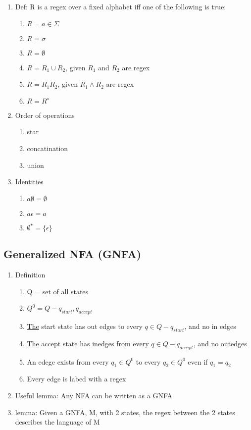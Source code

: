 \documentclass[11pt]{article}
\begin{document}
\begin{enumerate}
\item Def: R is a regex over a fixed alphabet iff one of the
      following is true:

\begin{enumerate}
\item $R=a\in\Sigma$
\item $R=\sigma$
\item $R=\emptyset$
\item $R=R_1\cup R_2$, given $R_1$ and $R_2$ are regex
\item $R = R_1 R_2$, given $R_1 \wedge R_2$ are regex
\item $R = R^{\star}$
\end{enumerate}

\item Order of operations

\begin{enumerate}
\item star
\item concatination
\item union
\end{enumerate}

\item Identities

\begin{enumerate}
\item $a \emptyset = \emptyset$
\item $a \epsilon = a$
\item $\emptyset^{\star} = \{\epsilon\}$
\end{enumerate}

\end{enumerate}
\subsection{Generalized NFA (GNFA)}
\label{sec-2.4}

\begin{enumerate}
\item Definition

\begin{enumerate}
\item Q = set of all states
\item $Q^0 = Q - {q_{start}, q_{accept}}$
\item \underline{The} start state has out edges to every $q\in Q - {q_{start}}$, and
         no in edges
\item \underline{The} accept state has inedges from every $q\in Q - {q_{accept}}$,
         and no outedges
\item An edege exists from every $q_1\in Q^0$ to every $q_2\in Q^0$
         even if $q_1=q_2$
\item Every edge is labed with a regex
\end{enumerate}

\item Useful lemma: Any NFA can be written as a GNFA
\item lemma: Given a GNFA, M,  with 2 states, the regex between the 2
      states describes the language of M
\end{enumerate}
\end{document}

